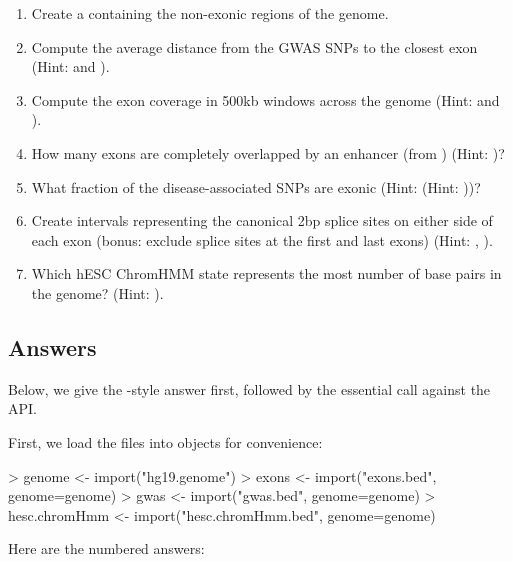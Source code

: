 \documentclass[10pt]{article}
\begin{document}
\begin{enumerate}
\item Create a  containing the non-exonic regions of
  the genome.
\item Compute the average distance from the GWAS SNPs to the closest
  exon (Hint:  and
  ).
\item Compute the exon coverage in 500kb windows across the genome
  (Hint:  and ).
\item How many exons are completely overlapped by an enhancer (from
  ) (Hint: )?
\item What fraction of the disease-associated SNPs are exonic 
  (Hint: (Hint: ))?
\item Create intervals representing the canonical 2bp splice sites on
  either side of each exon (bonus: exclude splice sites at the first
  and last exons) (Hint: ,
  ).
\item Which hESC ChromHMM state represents the most number of base
  pairs in the genome? (Hint: ).
\end{enumerate}

\subsection{Answers}
Below, we give the -style answer first, followed by
the essential call against the \Bioconductor{} API.

First, we load the files into \R{} objects for convenience:
\begin{Schunk}
\begin{Sinput}
> genome <- import("hg19.genome")
> exons <- import("exons.bed", genome=genome)
> gwas <- import("gwas.bed", genome=genome)
> hesc.chromHmm <- import("hesc.chromHmm.bed", genome=genome)
\end{Sinput}
\end{Schunk}

Here are the numbered answers:
\end{document}
